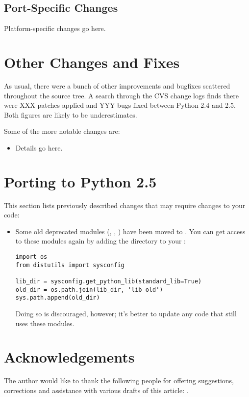 \documentclass{howto}
\begin{document}
\subsection{Port-Specific Changes}

Platform-specific changes go here.


\section{Other Changes and Fixes \label{section-other}}

As usual, there were a bunch of other improvements and bugfixes
scattered throughout the source tree.  A search through the CVS change
logs finds there were XXX patches applied and YYY bugs fixed between
Python 2.4 and 2.5.  Both figures are likely to be underestimates.

Some of the more notable changes are:

\begin{itemize}

\item Details go here.

\end{itemize}


\section{Porting to Python 2.5}

This section lists previously described changes that may require
changes to your code:

\begin{itemize}

\item Some old deprecated modules (, ,
      )  have been moved to .
You can get access to these modules  again by adding the directory 
to your :

\begin{verbatim}
import os
from distutils import sysconfig

lib_dir = sysconfig.get_python_lib(standard_lib=True)
old_dir = os.path.join(lib_dir, 'lib-old')
sys.path.append(old_dir)
\end{verbatim}

Doing so is discouraged, however; it's better to update any code that
still uses these modules.


\end{itemize}


\section{Acknowledgements \label{acks}}

The author would like to thank the following people for offering
suggestions, corrections and assistance with various drafts of this
article: .
\end{document}
